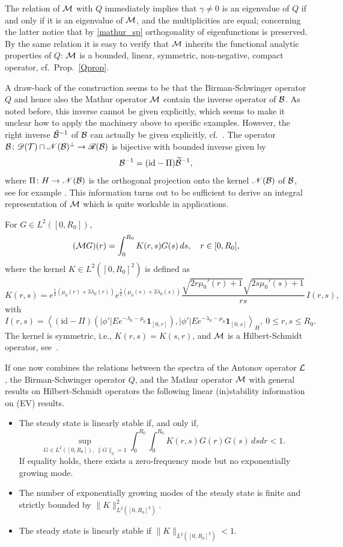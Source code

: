 \documentclass[11pt]{article}
\begin{document}
The relation of ${\cal M}$ with $Q$ immediately implies that
$\gamma\neq 0$ is an eigenvalue of $Q$ if and only if it is an eigenvalue of
${\cal M}$, and the multiplicities are equal; concerning the latter notice
that by \eqref{mathur_sp} orthogonality of eigenfunctions is preserved.
By the same relation it is easy to verify that ${\cal M}$ inherits the functional
analytic properties of $Q$: ${\cal M}$ is a bounded, linear, symmetric,
non-negative, compact operator, cf.~Prop.~\ref{Qprop}.

A draw-back of the construction seems to be that the
Birman-Schwinger operator $Q$ and hence also the Mathur operator ${\cal M}$
contain the inverse operator of ${\cal B}$. As noted before, this inverse
cannot be given explicitly, which seems to make it unclear how to
apply the machinery above to specific examples. However, the right
inverse $\tilde{{\cal B}}^{-1}$ of ${\cal B}$ can actually be given explicitly,
cf.~\cite[Def.~5.7]{GueStrRe}.
The operator ${\cal B} \colon {\mathscr D}({\cal T}) \cap {\mathscr N}({\cal B})^\bot  \to {\mathscr R}({\cal B})$ is
bijective with bounded inverse given by 
\[ 
{\cal B}^{-1} = (\mathrm{id}-\Pi)\widetilde{{\cal B}}^{-1},
\]
where $\Pi \colon H \to {\mathscr N}({\cal B})$ is the orthogonal projection
onto the kernel ${\mathscr N}({\cal B})$ of ${\cal B}$, see for example \cite[Section~5.4]{HiSi}.
This information turns out to be sufficient to derive an integral
representation of ${\cal M}$ which is quite workable in applications.
%
\begin{proposition}\label{MKdef}
  For  $G\in L^2([0,R_0])$,
  \[ 
  ({\cal M} G)(r) =  \int_0^{R_0} K(r,s) G(s) \, ds, \quad r\in[0,R_0],
  \]
  where the kernel $K \in L^2([0,R_0]^2)$ is defined as
  \[ 
  K(r,s) = e^{\frac{1}{2}(\mu_0(r) + 3\lambda_0(r))}
  e^{\frac{1}{2}(\mu_0(s) + 3\lambda_0(s))}
  \frac{\sqrt{2r\mu_0'(r)+1}\sqrt{2s\mu_0'(s)+1}}{rs}  \, I(r,s),
  \] 
  with
  \[ 
  I(r,s) =
  \left \langle (\mathrm{id}-\Pi) \left ( |\phi'|E e^{-\lambda_0-\mu_0}
  \mathbf{1}_{[0,r]} \right ),
  |\phi'|  E e^{-\lambda_0-\mu_0}  \mathbf{1}_{[0,s]}  \right \rangle_H,\
  0\leq r,s \leq R_0 .
  \] 
  The kernel is symmetric, i.e., $K(r,s)=K(s,r)$, and
  ${\cal M}$ is a Hilbert-Schmidt operator, see~\cite[Thm.~VI.22 et~seq.]{ReSi1}.
\end{proposition}
%
If one now combines the relations between the spectra of the Antonov operator
${\cal L}$, the Birman-Schwinger operator $Q$, and the Mathur operator ${\cal M}$
with general results on Hilbert-Schmidt operators the following linear
(in)stability information on (EV) results.
%
%
\begin{theorem}\label{mathur_stab}
  \begin{itemize}
  \item[(a)]
    The steady state is linearly stable if, and only if,
    \[
    \sup
    \limits_{G\in L^2([0,R_0]),\,\|G\|_{2}=1 }
    \int_{0}^{R_0}\int_{0}^{R_0} K(r,s) G(r)G(s) \, ds dr < 1.
    \]
    If equality holds, there exists a zero-frequency mode but
    no exponentially growing mode.
  \item[(b)]
    The number of exponentially growing modes of the steady state
    is finite and strictly bounded by $\|K\|_{L^2([0,R_0]^2)}^2$. 
  \item[(c)]
    The steady state is linearly stable if $\|K\|_{L^2([0,R_0]^2)}<1$.
  \end{itemize}
\end{theorem}
\end{document}
